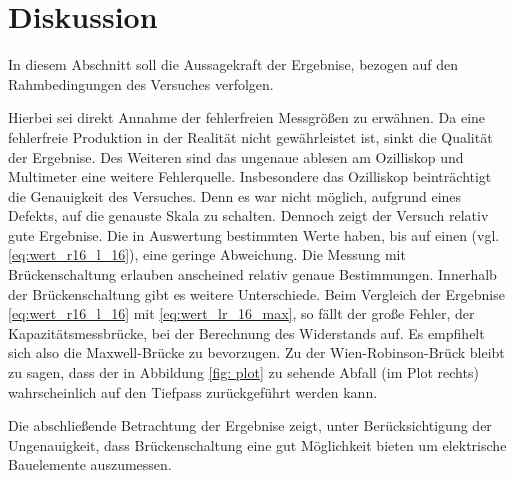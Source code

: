 \section{Diskussion}
In diesem Abschnitt soll die Aussagekraft der Ergebnise, bezogen auf den
Rahmbedingungen des Versuches verfolgen.

Hierbei sei direkt Annahme der fehlerfreien Messgrößen zu erwähnen.
Da eine fehlerfreie Produktion in der Realität nicht gewährleistet ist, 
sinkt die Qualität der Ergebnise.
Des Weiteren sind das ungenaue ablesen am Ozilliskop und Multimeter eine 
weitere Fehlerquelle.
Insbesondere das Ozilliskop beinträchtigt die Genauigkeit des Versuches.
Denn es war nicht möglich, aufgrund eines Defekts, auf die genauste 
Skala zu schalten.
Dennoch zeigt der Versuch relativ gute Ergebnise. 
Die in Auswertung bestimmten Werte haben, bis auf einen (vgl. \eqref{eq:wert_r16_l_16}), eine geringe Abweichung.
Die Messung mit Brückenschaltung erlauben anscheined relativ genaue Bestimmungen.
Innerhalb der Brückenschaltung gibt es weitere Unterschiede.
Beim Vergleich der Ergebnise \eqref{eq:wert_r16_l_16} mit \eqref{eq:wert_lr_16_max}, 
so fällt der große Fehler, der Kapazitätsmessbrücke, bei der Berechnung des Widerstands
auf. Es empfihelt sich also die Maxwell-Brücke zu bevorzugen.
Zu der Wien-Robinson-Brück bleibt zu sagen, dass der in Abbildung \ref{fig: plot}
zu sehende Abfall (im Plot rechts) wahrscheinlich auf den Tiefpass zurückgeführt werden
kann.

Die abschließende Betrachtung der Ergebnise zeigt, unter Berücksichtigung der Ungenauigkeit, 
dass Brückenschaltung eine gut Möglichkeit bieten um elektrische Bauelemente 
auszumessen.